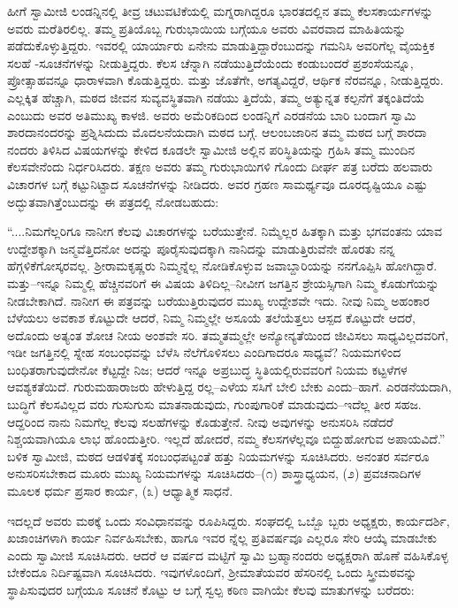 ಹೀಗೆ ಸ್ವಾಮೀಜಿ ಲಂಡನ್ನಿನಲ್ಲಿ ತೀವ್ರ ಚಟುವಟಿಕೆಯಲ್ಲಿ ಮಗ್ನರಾಗಿದ್ದರೂ ಭಾರತದಲ್ಲಿನ ತಮ್ಮ ಕೆಲಸಕಾರ್ಯಗಳನ್ನು ಅವರು ಮರೆತಿರಲಿಲ್ಲ. ತಮ್ಮ ಪ್ರತಿಯೊಬ್ಬ ಗುರುಭಾಯಿಯ ಬಗ್ಗೆಯೂ ಅವರು ವಿವರವಾದ ಮಾಹಿತಿಯನ್ನು ಪಡೆದುಕೊಳ್ಳುತ್ತಿದ್ದರು. ಇವರಲ್ಲಿ ಯಾರ್ಯಾರು ಏನೇನು ಮಾಡುತ್ತಿದ್ದಾರೆಂಬುದನ್ನು ಗಮನಿಸಿ ಅವರಿಗೆಲ್ಲ ವೈಯಕ್ತಿಕ ಸಲಹೆ -ಸೂಚನೆಗಳನ್ನು ನೀಡುತ್ತಿದ್ದರು. ಕೆಲಸ ಚೆನ್ನಾಗಿ ನಡೆಯುತ್ತಿದೆಯೆಂದು ಕಂಡುಬಂದರೆ ಪ್ರಶಂಸೆಯನ್ನೂ, ಪ್ರೋತ್ಸಾಹವನ್ನೂ ಧಾರಾಳವಾಗಿ ಕೊಡುತ್ತಿದ್ದರು. ಮತ್ತು ಜೊತೆಗೇ, ಅಗತ್ಯವಿದ್ದರೆ, ಆರ್ಥಿಕ ನೆರವನ್ನೂ, ನೀಡುತ್ತಿದ್ದರು. ಎಲ್ಲಕ್ಕಿತ ಹೆಚ್ಚಾಗಿ, ಮಠದ ಜೀವನ ಸುವ್ಯವಸ್ಥಿತವಾಗಿ ನಡೆಯು ತ್ತಿದೆಯೆ, ತಮ್ಮ ಅತ್ಯುನ್ನತ ಕಲ್ಪನೆಗೆ ತಕ್ಕಂತಿದೆಯೆ ಎಂಬುದು ಅವರ ಅತಿಮುಖ್ಯ ಕಾಳಜಿ. ಅವರು ಅಮೆರಿಕದಿಂದ ಲಂಡನ್ನಿಗೆ ಎರಡನೆಯ ಬಾರಿ ಬಂದಾಗ ಸ್ವಾಮಿ ಶಾರದಾನಂದರನ್ನು ಪ್ರಶ್ನಿಸಿದುದು ಮೊದಲನೆಯದಾಗಿ ಮಠದ ಬಗ್ಗೆ. ಆಲಂಬಜಾರಿನ ತಮ್ಮ ಮಠದ ಬಗ್ಗೆ ಶಾರದಾ ನಂದರು ತಿಳಿಸಿದ ವಿಷಯಗಳನ್ನು ಕೇಳಿದ ಕೂಡಲೇ ಸ್ವಾಮೀಜಿ ಅಲ್ಲಿನ ಪರಿಸ್ಥಿತಿಯನ್ನು ಗ್ರಹಿಸಿ ತಮ್ಮ ಮುಂದಿನ ಕೆಲಸವೇನೆಂದು ನಿರ್ಧರಿಸಿದರು. ತಕ್ಷಣ ಅವರು ತಮ್ಮ ಗುರುಭಾಯಿಗಳಿ ಗೊಂದು ದೀರ್ಘ ಪತ್ರ ಬರೆದು ಹಲವಾರು ವಿಚಾರಗಳ ಬಗ್ಗೆ ಕಟ್ಟುನಿಟ್ಟಾದ ಸೂಚನೆಗಳನ್ನು ನೀಡಿದರು. ಅವರ ಗ್ರಹಣ ಸಾಮರ್ಥ್ಯವೂ ದೂರದೃಷ್ಟಿಯೂ ಎಷ್ಟು ಅದ್ಭುತವಾಗಿತ್ತೆಂಬುದನ್ನು ಈ ಪತ್ರದಲ್ಲಿ ನೋಡಬಹುದು:

“....ನಿಮಗೆಲ್ಲರಿಗೂ ನಾನೀಗ ಕೆಲವು ವಿಚಾರಗಳನ್ನು ಬರೆಯುತ್ತೇನೆ. ನಿಮ್ಮೆಲ್ಲರ ಹಿತಕ್ಕಾಗಿ ಮತ್ತು ಭಗವಂತನು ಯಾವ ಉದ್ದೇಶಕ್ಕಾಗಿ ಜನ್ಮವೆತ್ತಿದನೋ ಅದನ್ನು ಪೂರೈಸುವುದಕ್ಕಾಗಿ ನಾನಿದನ್ನು ಮಾಡುತ್ತಿರುವೆನೇ ಹೊರತು ನನ್ನ ಹೆಗ್ಗಳಿಕೆಗೋಸ್ಕರವಲ್ಲ. ಶ್ರೀರಾಮಕೃಷ್ಣರು ನಿಮ್ಮನ್ನೆಲ್ಲ ನೋಡಿಕೊಳ್ಳುವ ಜವಾಬ್ದಾರಿಯನ್ನು ನನಗೊಪ್ಪಿಸಿ ಹೋಗಿದ್ದಾರೆ. ಮತ್ತು–ಇನ್ನೂ ನಿಮ್ಮಲ್ಲಿ ಹೆಚ್ಚಿನವರಿಗೆ ಈ ವಿಷಯ ತಿಳಿದಿಲ್ಲ–ನೀವೀಗ ಜಗತ್ತಿನ ಶ್ರೇಯಸ್ಸಿಗಾಗಿ ನಿಮ್ಮ ಕೊಡುಗೆಯನ್ನು ನೀಡಬೇಕಾಗಿದೆ. ನಾನೀಗ ಈ ಪತ್ರವನ್ನು ಬರೆಯುತ್ತಿರುವುದರ ಮುಖ್ಯ ಉದ್ದೇಶವೇ ಇದು. ನೀವು ನಿಮ್ಮ ಅಹಂಕಾರ ಬೆಳೆಯಲು ಅವಕಾಶ ಕೊಟ್ಟುದೇ ಆದರೆ, ನಿಮ್ಮ ನಿಮ್ಮಲ್ಲೇ ಅಸೂಯೆ ತಲೆಯೆತ್ತಲು ಆಸ್ಪದ ಕೊಟ್ಟುದೇ ಆದರೆ, ಅದೊಂದು ಅತ್ಯಂತ ಶೋಚ ನೀಯ ಅಂಶವೇ ಸರಿ. ತಮ್ಮತಮ್ಮಲ್ಲೇ ಅನ್ಯೋನ್ಯತೆಯಿಂದ ಜೀವಿಸಲು ಸಾಧ್ಯವಿಲ್ಲದವರಿಗೆ, ಇಡೀ ಜಗತ್ತಿನಲ್ಲಿ ಸ್ನೇಹ ಸಂಬಂಧವನ್ನು ಬೆಳೆಸಿ ನೆಲೆಗೊಳಿಸಲು ಎಂದಿಗಾದರೂ ಸಾಧ್ಯವೆ? ನಿಯಮಗಳಿಂದ ಬಂಧಿತರಾಗುವುದೇನೋ ಕೆಟ್ಟದ್ದೇ ನಿಜ; ಆದರೆ ಇನ್ನೂ ಅಪ್ರಬುದ್ಧ ಸ್ಥಿತಿಯಲ್ಲಿರುವವರಿಗೆ ನಿಯಮ ಕಟ್ಟಳೆಗಳ ಆವಶ್ಯಕತೆಯಿದೆ. ಗುರುಮಹಾರಾಜರು ಹೇಳುತ್ತಿದ್ದ ರಲ್ಲ–ಎಳೆಯ ಸಸಿಗೆ ಬೇಲಿ ಬೇಕು ಎಂದು–ಹಾಗೆ. ಎರಡನೆಯದಾಗಿ, ಬುದ್ಧಿಗೆ ಕೆಲಸವಿಲ್ಲದ ವರು ಗುಸುಗುಸು ಮಾತನಾಡುವುದು, ಗುಂಪುಗಾರಿಕೆ ಮಾಡುವುದು–ಇದೆಲ್ಲ ತೀರ ಸಹಜ. ಆದ್ದರಿಂದ ನಾನು ನಿಮಗೆಲ್ಲ ಕೆಲವು ಸಲಹೆಗಳನ್ನು ಕೊಡುತ್ತೇನೆ. ನೀವು ಅವುಗಳನ್ನು ಅನುಸರಿಸಿ ನಡೆದರೆ ನಿಶ್ಚಯವಾಗಿಯೂ ಲಾಭ ಹೊಂದುತ್ತೀರಿ. ಇಲ್ಲದೆ ಹೋದರೆ, ನಮ್ಮ ಕೆಲಸಗಳೆಲ್ಲವೂ ಬಿದ್ದುಹೋಗುವ ಅಪಾಯವಿದೆ.” ಬಳಿಕ ಸ್ವಾಮೀಜಿ, ಮಠದ ಆಡಳಿತಕ್ಕೆ ಸಂಬಂಧಪಟ್ಟಂತೆ ಹತ್ತು ನಿಯಮಗಳನ್ನು ಸೂಚಿಸಿದರು. ಅನಂತರ ಸರ್ವರೂ ಅನುಸರಿಸಬೇಕಾದ ಮೂರು ಮುಖ್ಯ ನಿಯಮಗಳನ್ನು ಸೂಚಿಸಿದರು–(೧) ಶಾಸ್ತ್ರಾಧ್ಯಯನ, (೨) ಪ್ರವಚನಾದಿಗಳ ಮೂಲಕ ಧರ್ಮ ಪ್ರಸಾರ ಕಾರ್ಯ, (೩) ಆಧ್ಯಾತ್ಮಿಕ ಸಾಧನೆ.

ಇದಲ್ಲದೆ ಅವರು ಮಠಕ್ಕೆ ಒಂದು ಸಂವಿಧಾನವನ್ನು ರೂಪಿಸಿದ್ದರು. ಸಂಘದಲ್ಲಿ ಒಬ್ಬೊ ಬ್ಬರು ಅಧ್ಯಕ್ಷರು, ಕಾರ್ಯದರ್ಶಿ, ಖಜಾಂಚಿಗಳಾಗಿ ಕಾರ್ಯ ನಿರ್ವಹಿಸಬೇಕು, ಹಾಗೂ ಇವರ ನ್ನೆಲ್ಲ ಪ್ರತಿವರ್ಷವೂ ಎಲ್ಲರೂ ಸೇರಿ ಆಯ್ಕೆ ಮಾಡಬೇಕು ಎಂದು ಸ್ವಾಮೀಜಿ ಸೂಚಿಸಿದರು. ಆದರೆ ಆ ವರ್ಷದ ಮಟ್ಟಿಗೆ ಸ್ವಾಮಿ ಬ್ರಹ್ಮಾನಂದರು ಅಧ್ಯಕ್ಷರಾಗಿ ಹೊಣೆ ವಹಿಸಿಕೊಳ್ಳ ಬೇಕೆಂದೂ ನಿರ್ದಿಷ್ಟವಾಗಿ ಸೂಚಿಸಿದರು. ಇವುಗಳೊಂದಿಗೆ, ಶ್ರೀಮಾತೆಯವರ ಹೆಸರಿನಲ್ಲಿ ಒಂದು ಸ್ತ್ರೀಮಠವನ್ನು ಸ್ಥಾಪಿಸುವುದರ ಬಗ್ಗೆಯೂ ಸೂಚನೆ ಕೊಟ್ಟು ಆ ಬಗ್ಗೆ ಸ್ವಲ್ಪ ಕಠಿಣ ವಾಗಿಯೇ ಕೆಲವು ಮಾತುಗಳನ್ನು ಬರೆದರು:

